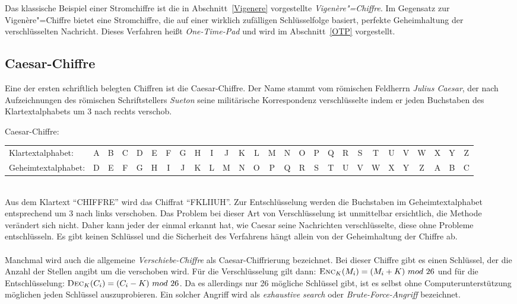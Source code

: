 Das klassische Beispiel einer Stromchiffre ist die in Abschnitt~\ref{Vigenere} vorgestellte \emph{Vigen\`ere"=Chiffre}. Im Gegensatz zur Vigen\`ere"=Chiffre
bietet eine Stromchiffre, die auf einer wirklich zufälligen Schlüsselfolge basiert, perfekte Geheimhaltung der verschlüsselten Nachricht. Dieses Verfahren heißt \emph{One-Time-Pad} und wird im Abschnitt~\ref{OTP} vorgestellt.

\subsection{Caesar-Chiffre}
Eine der ersten schriftlich belegten Chiffren ist die Caesar-Chiffre. Der Name stammt vom römischen Feldherrn \emph{Julius Caesar}, der nach Aufzeichnungen des
römischen Schriftstellers \emph{Sueton} seine militärische Korrespondenz verschlüsselte indem er jeden Buchstaben des Klartextalphabets um 3 nach rechts
verschob.\\
\begin{beispiel} Caesar-Chiffre:
\vspace{0.2cm}

\setlength{\tabcolsep}{2pt}
\begin{tabular}{l*{26}{c}}
Klartextalphabet: &A&B&C&D&E&F&G&H&I&J&K&L&M&N&O&P&Q&R&S&T&U&V&W&X&Y&Z\\
Geheimtextalphabet: &D&E&F&G&H&I&J&K&L&M&N&O&P&Q&R&S&T&U&V&W&X&Y&Z&A&B&C\\
\end{tabular}
\end{beispiel} \ \\
Aus dem Klartext "`CHIFFRE"' wird das Chiffrat "`FKLIIUH"'. Zur Entschlüsselung werden die Buchstaben im Geheimtextalphabet entsprechend um 3 nach links
verschoben. Das Problem bei dieser Art von Verschlüsselung ist unmittelbar ersichtlich, die Methode verändert sich nicht. Daher kann jeder der einmal erkannt
hat, wie Caesar seine Nachrichten verschlüsselte, diese ohne Probleme entschlüsseln. Es gibt keinen Schlüssel und die Sicherheit des Verfahrens hängt allein von
der Geheimhaltung der Chiffre ab.\\ \ \\
Manchmal wird auch die allgemeine \emph{Verschiebe-Chiffre} als Caesar-Chiffrierung bezeichnet. Bei dieser Chiffre gibt es einen Schlüssel, der die Anzahl der
Stellen angibt um die verschoben wird. Für die Verschlüsselung gilt dann: $\enc_\key(\plaint_i) = (\plaint_i + \key)\ mod\ 26$ und für die Entschlüsselung:
$\dec_\key(\ciphert_i) = (\ciphert_i - \key)\ mod\ 26$. Da es allerdings nur 26 mögliche Schlüssel gibt, ist es selbst ohne Computerunterstützung möglichen
jeden Schlüssel auszuprobieren. Ein solcher Angriff wird als \emph{exhaustive search} oder \emph{Brute-Force-Angriff} bezeichnet.

